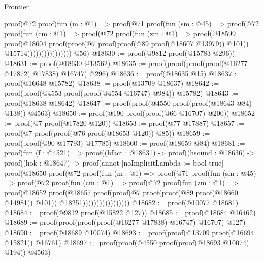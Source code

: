 \begin{lexlean}{Frontier}
\begin{coremodule}
                  proof(@72
                      proof(fun (m : @1) =>
                        proof(@71
                            proof(fun (sm : @45) =>
                              proof(@72
                                  proof(fun (cm : @1) =>
                                    proof(@72
                                        proof(fun (zm : @1) =>
                                          proof(@18599
                                              proof(@18604
                                                  proof(proof(@7
                                                        proof(proof(@89 proof(@18607 @13979)) @101))
                                                      @15714))))))))))))))))
      @56)
@18630 := proof(@9812 proof(@15783 @296))
@18631 := proof(@18630 @13562)
@18635 := proof(proof(proof(proof(@16277 @17872) @17838) @16747) @296)
@18636 := proof(@18635 @15)
@18637 := proof(@16648 @15782)
@18638 := proof(@13709 @18637)
@18642 := proof(proof(@4553 proof(proof(@4554 @16747) @984)) @15782)
@18643 := proof(@18638 @18642)
@18647 := proof(proof(@4550 proof(proof(@18643 @84) @138)) @4563)
@18650 := proof(@190 proof(proof(@66 @16707) @200))
@18652 := proof(@7 proof(@17820 @120))
@18653 := proof(@77 @17887)
@18657 := proof(@7 proof(proof(@76 proof(@18653 @120)) @85))
@18659 := proof(proof(@90 @17793) @17785)
@18660 := proof(@18659 @84)
@18681 := proof(fun (f : @4521) =>
    proof((hfact : @18631) ->
      proof((hsound : @18636) ->
        proof((hok : @18647) ->
          proof(annot [noImplicitLambda := bool true]
            proof(@18650
                proof(@72
                    proof(fun (m : @1) =>
                      proof(@71
                          proof(fun (sm : @45) =>
                            proof(@72
                                proof(fun (cm : @1) =>
                                  proof(@72
                                      proof(fun (zm : @1) =>
                                        proof(@18652
                                            proof(@18657
                                                proof(proof(@7
                                                      proof(proof(@89 proof(@18660 @14981)) @101))
                                                    @18251)))))))))))))))))
@18682 := proof(@10077 @18681)
@18684 := proof(@9812 proof(@15822 @127))
@18685 := proof(@18684 @16462)
@18689 := proof(proof(proof(proof(@16277 @17838) @16747) @16707) @127)
@18690 := proof(@18689 @10074)
@18693 := proof(proof(@13709 proof(@16694 @15821)) @16761)
@18697 := proof(proof(@4550 proof(proof(@18693 @10074) @194)) @4563)

\end{coremodule}
\end{lexlean}
